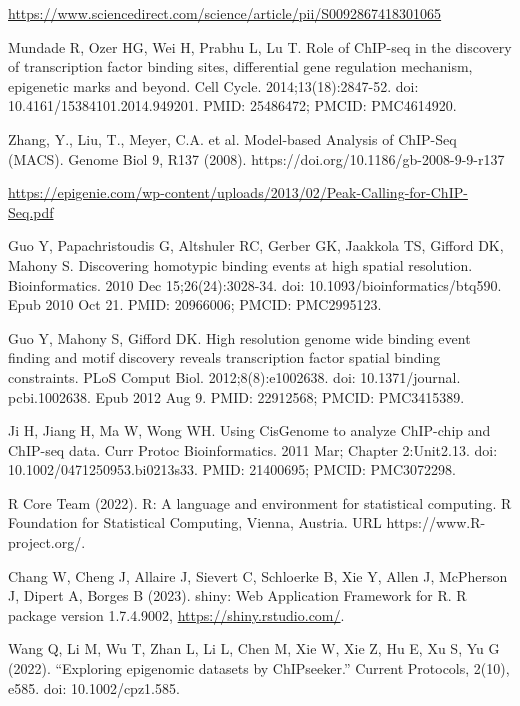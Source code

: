 \documentclass[12pt]{article}
\begin{document}
\begin{thebibliography}{99}
 \url{https://www.sciencedirect.com/science/article/pii/S0092867418301065}

 Mundade R, Ozer HG, Wei H, Prabhu L, Lu T. Role of ChIP-seq
in the discovery of transcription factor binding sites, differential gene
regulation mechanism, epigenetic marks and beyond. Cell Cycle.
2014;13(18):2847-52. doi: 10.4161/15384101.2014.949201. PMID: 25486472;
PMCID: PMC4614920.

 Zhang, Y., Liu, T., Meyer, C.A. et al. Model-based Analysis
of ChIP-Seq (MACS). Genome Biol 9, R137 (2008).
https://doi.org/10.1186/gb-2008-9-9-r137

 \url{https://epigenie.com/wp-content/uploads/2013/02/Peak-Calling-for-ChIP-Seq.pdf}

 Guo Y, Papachristoudis G, Altshuler RC, Gerber GK, Jaakkola
TS, Gifford DK, Mahony S. Discovering homotypic binding events at high spatial
resolution. Bioinformatics. 2010 Dec 15;26(24):3028-34.
doi: 10.1093/bioinformatics/btq590. Epub 2010 Oct 21. PMID: 20966006;
PMCID: PMC2995123.

 Guo Y, Mahony S, Gifford DK. High resolution genome wide
binding event finding and motif discovery reveals transcription factor spatial
binding constraints. PLoS Comput Biol. 2012;8(8):e1002638. doi: 10.1371/journal.
pcbi.1002638. Epub 2012 Aug 9. PMID: 22912568; PMCID: PMC3415389.

 Ji H, Jiang H, Ma W, Wong WH. Using CisGenome to analyze
ChIP-chip and ChIP-seq data. Curr Protoc Bioinformatics. 2011 Mar;
Chapter 2:Unit2.13. doi: 10.1002/0471250953.bi0213s33. PMID: 21400695;
PMCID: PMC3072298.

 R Core Team (2022). R: A language and environment for statistical
computing. R Foundation for Statistical Computing, Vienna, Austria. URL
https://www.R-project.org/.

 Chang W, Cheng J, Allaire J, Sievert C, Schloerke B, Xie Y,
Allen J, McPherson J, Dipert A, Borges B (2023). shiny: Web Application
Framework for R. R package version 1.7.4.9002, \url{https://shiny.rstudio.com/}.

 Wang Q, Li M, Wu T, Zhan L, Li L, Chen M, Xie W, Xie Z,
Hu E, Xu S, Yu G (2022). “Exploring epigenomic datasets by ChIPseeker.”
Current Protocols, 2(10), e585. doi: 10.1002/cpz1.585.

\end{thebibliography}
\newpage
\end{document}
